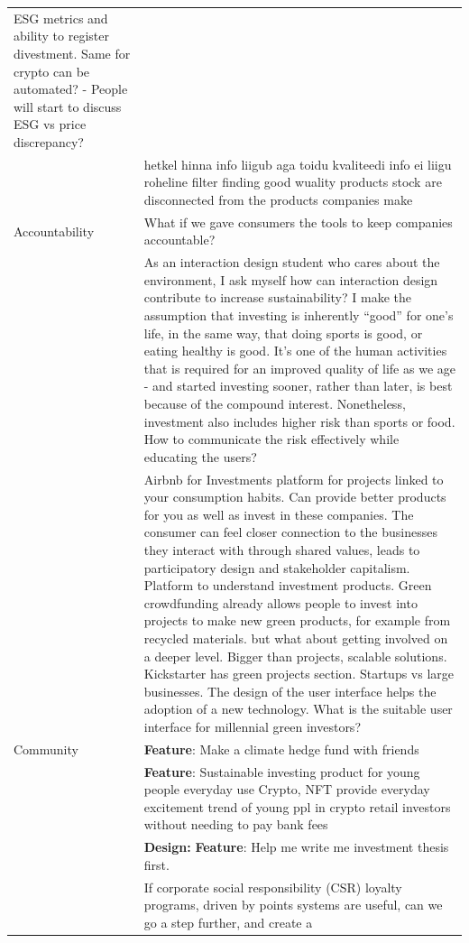 \documentclass[
  letterpaper,
  DIV=11,
  numbers=noendperiod]{scrartcl}
\begin{document}
\begin{longtable}[]{@{}
  >{\raggedright\arraybackslash}p{}
  >{\raggedright\arraybackslash}p{}@{}}
ESG metrics and ability to register divestment. Same for crypto can be
automated? - People will start to discuss ESG vs price discrepancy? \\
& hetkel hinna info liigub aga toidu kvaliteedi info ei liigu roheline
filter finding good wuality products stock are disconnected from the
products companies make \\
Accountability & What if we gave consumers the tools to keep companies
accountable? \\
& As an interaction design student who cares about the environment, I
ask myself how can interaction design contribute to increase
sustainability? I make the assumption that investing is inherently
``good'' for one's life, in the same way, that doing sports is good, or
eating healthy is good. It's one of the human activities that is
required for an improved quality of life as we age - and started
investing sooner, rather than later, is best because of the compound
interest. Nonetheless, investment also includes higher risk than sports
or food. How to communicate the risk effectively while educating the
users? \\
& Airbnb for Investments platform for projects linked to your
consumption habits. Can provide better products for you as well as
invest in these companies. The consumer can feel closer connection to
the businesses they interact with through shared values, leads to
participatory design and stakeholder capitalism. Platform to understand
investment products. Green crowdfunding already allows people to invest
into projects to make new green products, for example from recycled
materials. but what about getting involved on a deeper level. Bigger
than projects, scalable solutions. Kickstarter has green projects
section. Startups vs large businesses. The design of the user interface
helps the adoption of a new technology. What is the suitable user
interface for millennial green investors? \\
Community & \textbf{Feature}: Make a climate hedge fund with friends \\
& \textbf{Feature}: Sustainable investing product for young people
everyday use Crypto, NFT provide everyday excitement trend of young ppl
in crypto retail investors without needing to pay bank fees \\
& \textbf{Design:} \textbf{Feature}: Help me write me investment thesis
first. \\
& If corporate social responsibility (CSR) loyalty programs, driven by
points systems are useful, can we go a step further, and create a

\end{longtable}
\end{document}
